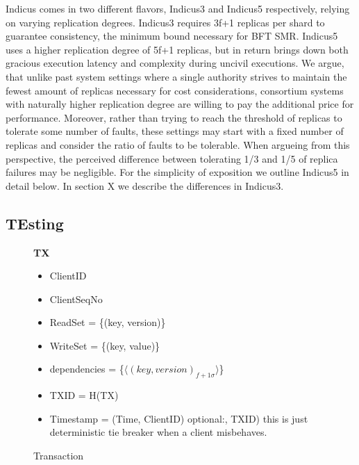 %
%
%
%
%
%
%
%


Indicus comes in two different flavors, Indicus3 and Indicus5 respectively, relying on varying replication degrees. Indicus3 requires 3f+1 replicas per shard to guarantee consistency, the minimum bound necessary for BFT SMR. Indicus5 uses a higher replication degree of 5f+1 replicas, but in return brings down both gracious execution latency and complexity during uncivil executions. We argue, that unlike past system settings where a single authority strives to maintain the fewest amount of replicas necessary for cost considerations, consortium systems with naturally higher replication degree are willing to pay the additional price for performance. Moreover, rather than trying to reach the threshold of replicas to tolerate some number of faults, these settings may start with a fixed number of replicas and consider the ratio of faults to be tolerable. When argueing from this perspective, the perceived difference between tolerating 1/3 and 1/5 of replica failures may be negligible.
For the simplicity of exposition we outline Indicus5 in detail below. In section X we describe the differences in Indicus3.

\subsection{TEsting}
\begin{figure}[t]
  \begin{mdframed}[roundcorner=10pt]
 	\textbf{TX}
 	\begin{itemize}
 	\item ClientID
 	\item ClientSeqNo
 	\item ReadSet = \{(key, version)\}
 	\item WriteSet = \{(key, value)\}
 	\item dependencies = \{$\langle (key, version)_{f+1 \sigma} \rangle$\}
 	\item TXID = H(TX)
 	\item Timestamp = (Time, ClientID)  optional:, TXID) this is just deterministic tie breaker when a client misbehaves.
 	\end{itemize}
  \end{mdframed}
  \caption{Transaction}
  \label{fig:TX}
\end{figure}


